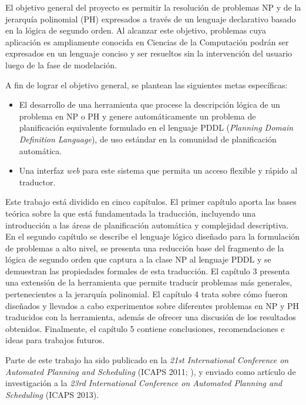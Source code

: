 El objetivo general del proyecto es permitir la resolución de problemas
NP y de la jerarquía polinomial (PH) expresados a través de un lenguaje declarativo basado en 
la lógica de segundo orden.
Al alcanzar este objetivo, problemas cuya aplicación es
ampliamente conocida en Ciencias de la Computación podrán ser expresados
en un lenguaje conciso y ser resueltos sin la intervención del usuario luego de
la fase de modelación.

A fin de lograr el objetivo general, se plantean las siguientes metas
específicas:
\begin{itemize}
\item El desarrollo de una herramienta que procese la descripción lógica de un problema 
en NP o PH y genere automáticamente un problema de planificación equivalente 
formulado en el lenguaje PDDL (\textit{Planning Domain Definition Language}),
de uso estándar en la comunidad de planificación automática.
\item Una interfaz \textit{web} para este sistema que permita un acceso flexible
y rápido al traductor.
\end{itemize}

Este trabajo está dividido en cinco capítulos. El primer capítulo aporta las
bases teórica sobre la que está fundamentada la traducción, incluyendo una
introducción a las áreas de planificación automática y complejidad descriptiva.
En el segundo capítulo se describe el lenguaje lógico diseñado para la
formulación de problemas a alto nivel, se presenta una reducción base del
fragmento de la lógica de segundo orden que captura a la clase NP
al lenguaje PDDL y se demuestran las propiedades formales de esta
traducción. 
El capítulo 3 presenta una extensión de la herramienta que
permite traducir problemas más generales, pertenecientes a la jerarquía
polinomial.
El capítulo 4 trata sobre cómo fueron diseñados y llevados a
cabo experimentos sobre diferentes problemas en NP y PH traducidos con la herramienta,
además de ofrecer una discusión de los resultados obtenidos. Finalmente, el
capítulo 5 contiene conclusiones, recomendaciones e ideas para trabajos
futuros.

Parte de este trabajo ha sido publicado en la \textit{21st International Conference on
Automated Planning and Scheduling} (ICAPS 2011;
\citeauthor{porco:npreductions}), y
enviado como artículo de investigación a la \textit{23rd International
Conference on Automated Planning and Scheduling} (ICAPS 2013).

